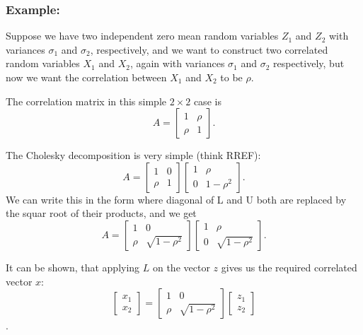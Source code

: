 \documentclass{amsart}
\theoremstyle{plain}
\numberwithin{equation}{section}
\begin{document}
\subsubsection{Example:}
Suppose we have two independent zero mean random variables 
$Z_1$ and $Z_2$ with variances $\sigma_1$ and $\sigma_2$, 
respectively, and we want to construct two correlated random variables
$X_1$ and $X_2$, again with variances $\sigma_1$ and $\sigma_2$ respectively,
but now we want the correlation between $X_1$ and $X_2$ to be $\rho$. 

The correlation matrix in this simple $2 \times 2$ case is
\begin{equation}
A = \left[
\begin{array}{cc}
	1    & \rho\\
	\rho & 1
\end{array}
\right].
\label{}
\end{equation}

The Cholesky decomposition is very simple (think RREF):
\begin{equation}
A = \left[
\begin{array}{cc}
	1    & 0\\
	\rho & 1
\end{array}
\right]
\left[
\begin{array}{cc}
	1  & \rho\\
	0  & 1 - \rho^2
\end{array}
\right].
\label{}
\end{equation}
We can write this in the form where 
diagonal of L and U both are 
replaced by the squar root of their
products, and we get
\begin{equation}
A = \left[
\begin{array}{cc}
	1    & 0\\
	\rho & \sqrt{1-\rho^2}
\end{array}
\right]
\left[
\begin{array}{cc}
	1  & \rho\\
	0  & \sqrt{1 - \rho^2}
\end{array}
\right].
\label{}
\end{equation}

It can be shown, that applying $L$ on the vector $z$
gives us the required correlated vector $x$:
\begin{equation}
\left[
\begin{array}{c}
	  x_1 \\
		x_2 
\end{array}
\right] 
= \left[
\begin{array}{cc}
	1    & 0\\
	\rho & \sqrt{1-\rho^2}
\end{array}
\right]
\left[
\begin{array}{c}
	  z_1 \\
		z_2 
\end{array}
\right]
\label{}
\end{equation}.
\end{document}
